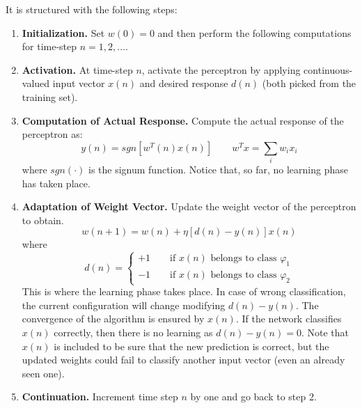 It is structured with the following steps:
\begin{enumerate}
	\item \textbf{Initialization.} Set $w(0) = 0$ and then perform the following computations for time-step $n=1,2,\dots$.
	\item \textbf{Activation.} At time-step $n$, activate the perceptron by applying continuous-valued input vector $x(n)$ and desired response $d(n)$ (both picked from the training set).
	\item \textbf{Computation of Actual Response.} Compute the actual response of the perceptron as:
	$$y(n) = sgn[w^T(n)x(n)] \qquad w^Tx = \sum_iw_ix_i$$
	where $sgn(\cdot)$ is the signum function. Notice that, so far, no learning phase has taken place.
	\item \textbf{Adaptation of Weight Vector.} Update the weight vector of the perceptron to obtain.
	$$w(n+1) = w(n) + \eta[d(n) - y(n)]x(n)$$
	where
	$$d(n) = 
	\begin{cases}
	+1 \qquad \text{if } x(n) \text{ belongs to class } \varphi_1\\
	-1 \qquad \text{if } x(n) \text{ belongs to class } \varphi_2 
	\end{cases}$$
	This is where the learning phase takes place. In case of wrong classification, the current configuration will change modifying $d(n) - y(n)$. The convergence of the algorithm is ensured by $x(n)$. If the network classifies $x(n)$ correctly, then there is no learning as $d(n)-y(n) = 0$. Note that $x(n)$ is included to be sure that the new prediction is correct, but the updated weights could fail to classify another input vector (even an already seen one).
	\item \textbf{Continuation.} Increment time step $n$ by one and go back to step 2.
\end{enumerate}

